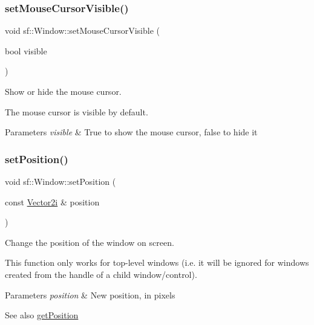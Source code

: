 \subsubsection{\texorpdfstring{set\+Mouse\+Cursor\+Visible()}{setMouseCursorVisible()}}
{\footnotesize\ttfamily void sf\+::\+Window\+::set\+Mouse\+Cursor\+Visible (\begin{DoxyParamCaption}\item[{bool}]{visible }\end{DoxyParamCaption})}



Show or hide the mouse cursor. 

The mouse cursor is visible by default.


\begin{DoxyParams}{Parameters}
{\em visible} & True to show the mouse cursor, false to hide it \\
\hline
\end{DoxyParams}
\mbox{\label{classsf_1_1_window_a6c4078bfbf61c29bfc4b4732ce764f17}} 
\subsubsection{\texorpdfstring{set\+Position()}{setPosition()}}
{\footnotesize\ttfamily void sf\+::\+Window\+::set\+Position (\begin{DoxyParamCaption}\item[{const \hyperlink{classsf_1_1_vector2}{Vector2i} \&}]{position }\end{DoxyParamCaption})}



Change the position of the window on screen. 

This function only works for top-\/level windows (i.\+e. it will be ignored for windows created from the handle of a child window/control).


\begin{DoxyParams}{Parameters}
{\em position} & New position, in pixels\\
\hline
\end{DoxyParams}
\begin{DoxySeeAlso}{See also}
\hyperlink{classsf_1_1_window_a420028b8e4d9baedcaaba7b2047b8cb3}{get\+Position} 
\end{DoxySeeAlso}
\mbox{\label{classsf_1_1_window_ab94ea32f22d15c0df11588e319de2546}} 
